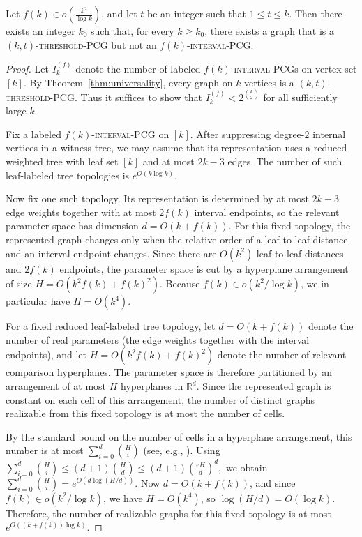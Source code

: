 \documentclass[a4paper,UKenglish,cleveref,autoref,thm-restate]{socg-lipics-v2021}
\begin{document}
\begin{theorem}\label{thm:threshold-vs-interval} Let $f(k)\in o\!\left(\frac{k^2}{\log k}\right)$, and let $t$ be an integer such that $1\le t\le k$. Then there exists an integer $k_0$ such that, for every $k\ge k_0$, there exists a graph that is a \textsc{$(k,t)$-threshold-\textsc{PCG}} but not an \textsc{$f(k)$-interval-\textsc{PCG}}. \end{theorem}


\begin{proof}
Let $I_k^{(f)}$ denote the number of labeled \textsc{$f(k)$-interval-\textsc{PCG}}s on
vertex set $[k]$. By Theorem~\ref{thm:universality}, every graph on $k$ vertices is a
\textsc{$(k,t)$-threshold-\textsc{PCG}}. Thus it suffices to show that
\(
I_k^{(f)} < 2^{\binom{k}{2}}
\)
for all sufficiently large $k$.

Fix a labeled \textsc{$f(k)$-interval-\textsc{PCG}} on $[k]$. After suppressing
degree-$2$ internal vertices in a witness tree, we may assume that its representation
uses a reduced weighted tree with leaf set $[k]$ and at most $2k-3$ edges. The number of
such leaf-labeled tree topologies is $e^{O(k\log k)}$.

Now fix one such topology. Its representation is determined by at most $2k-3$ edge
weights together with at most $2f(k)$ interval endpoints, so the relevant parameter space
has dimension
\(
d=O(k+f(k)).
\)
For this fixed topology, the represented graph changes only when the relative order of a
leaf-to-leaf distance and an interval endpoint changes. Since there are $O(k^2)$
leaf-to-leaf distances and $2f(k)$ endpoints, the parameter space is cut by a hyperplane
arrangement of size
\(
H=O(k^2f(k)+f(k)^2).
\)
Because $f(k)\in o(k^2/\log k)$, we in particular have $H=O(k^4)$.

For a fixed reduced leaf-labeled tree topology, let \(d=O(k+f(k))\) denote the number
of real parameters (the edge weights together with the interval endpoints), and let
\(H=O(k^2f(k)+f(k)^2)\) denote the number of relevant comparison hyperplanes. The
parameter space is therefore partitioned by an arrangement of at most \(H\) hyperplanes
in \(\mathbb R^d\). Since the represented graph is constant on each cell of this
arrangement, the number of distinct graphs realizable from this fixed topology is at most
the number of cells.

By the standard bound on the number of cells in a hyperplane arrangement, this number is
at most
\(
\sum_{i=0}^d \binom{H}{i}
\)
(see, e.g., \cite{Zaslavsky1975Facing}). Using
\(
\sum_{i=0}^d \binom{H}{i}
\le (d+1)\binom{H}{d}
\le (d+1)\left(\frac{eH}{d}\right)^d,
\)
we obtain
\(
\sum_{i=0}^d \binom{H}{i}
= e^{O\!\left(d\log(H/d)\right)}.
\)
Now \(d=O(k+f(k))\), and since \(f(k)\in o(k^2/\log k)\), we have
\(
H=O(k^4)
\),
so
\(
\log(H/d)=O(\log k).
\)
Therefore, the number of realizable graphs for this fixed topology is at most
\(
e^{O((k+f(k))\log k)}.
\)


\end{proof}
\end{document}
